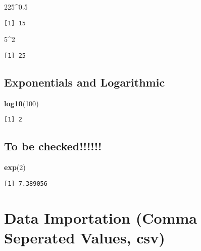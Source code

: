 \documentclass[
]{article}
\newenvironment{Shaded}{\begin{snugshade}}{\end{snugshade}}
\newcommand{\DecValTok}[1]{\textcolor[rgb]{0.00,0.00,0.81}{#1}}
\newcommand{\FloatTok}[1]{\textcolor[rgb]{0.00,0.00,0.81}{#1}}
\newcommand{\FunctionTok}[1]{\textcolor[rgb]{0.13,0.29,0.53}{\textbf{#1}}}
\newcommand{\NormalTok}[1]{#1}
\newcommand{\SpecialCharTok}[1]{\textcolor[rgb]{0.81,0.36,0.00}{\textbf{#1}}}
\begin{document}
\begin{Shaded}
\begin{Highlighting}[]
\DecValTok{225}\SpecialCharTok{\^{}}\FloatTok{0.5}
\end{Highlighting}
\end{Shaded}

\begin{verbatim}
[1] 15
\end{verbatim}

\begin{Shaded}
\begin{Highlighting}[]
\DecValTok{5}\SpecialCharTok{\^{}}\DecValTok{2}
\end{Highlighting}
\end{Shaded}

\begin{verbatim}
[1] 25
\end{verbatim}

\hypertarget{exponentials-and-logarithmic}{%
\subsection{Exponentials and
Logarithmic}\label{exponentials-and-logarithmic}}

\begin{Shaded}
\begin{Highlighting}[]
\FunctionTok{log10}\NormalTok{(}\DecValTok{100}\NormalTok{)}
\end{Highlighting}
\end{Shaded}

\begin{verbatim}
[1] 2
\end{verbatim}

\hypertarget{to-be-checked}{%
\subsection{To be checked!!!!!!}\label{to-be-checked}}

\begin{Shaded}
\begin{Highlighting}[]
\FunctionTok{exp}\NormalTok{(}\DecValTok{2}\NormalTok{)}
\end{Highlighting}
\end{Shaded}

\begin{verbatim}
[1] 7.389056
\end{verbatim}

\hypertarget{data-importation-comma-seperated-values-csv}{%
\section{Data Importation (Comma Seperated Values,
csv)}\label{data-importation-comma-seperated-values-csv}}
\end{document}
